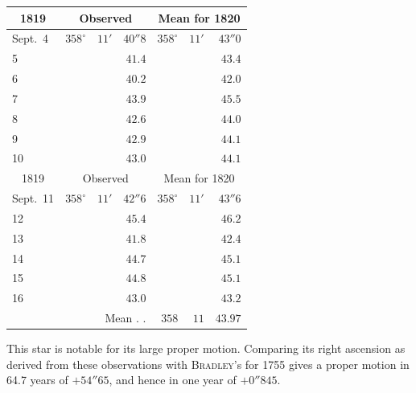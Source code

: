 \begin{center}
\begin{tabular}{l|rrr|rrr}
\multicolumn{1}{c|}{1819}  &  \multicolumn{3}{c|}{Observed}  &  \multicolumn{3}{c}{Mean for 1820}  \\
\hline
Sept.\ 4  &  $358^\circ$  &  $11'$  &  $40''8$  &  $358^\circ$  &  $11'$  &  $43''0$  \\
5  &   &   &  $41.4$  &   &   &  $43.4$  \\
6  &   &   &  $40.2$  &   &   &  $42.0$  \\
7  &   &   &  $43.9$  &   &   &  $45.5$  \\
8  &   &   &  $42.6$  &   &   &  $44.0$  \\
9  &   &   &  $42.9$  &   &   &  $44.1$  \\
10  &   &   &  $43.0$  &   &   &  $44.1$  \\
\hline
 \multicolumn{1}{c|}{1819}  &  \multicolumn{3}{c|}{Observed}  &  \multicolumn{3}{c}{Mean for 1820}  \\
\hline
 Sept.\ 11  &  $358^\circ$  &  $11'$  &  $42''6$  &  $358^\circ$  &  $11'$  &  $43''6$  \\
 12  &   &   &  $45.4$  &   &   &  $46.2$  \\
 13  &   &   &  $41.8$  &   &   &  $42.4$  \\
 14  &   &   &  $44.7$  &   &   &  $45.1$  \\
 15  &   &   &  $44.8$  &   &   &  $45.1$  \\
 16  &   &   &  $43.0$  &   &   &  $43.2$  \\
\multicolumn{4}{r|}{Mean . .} &  $358$  &  $11$  &  $43.97$  \\
\end{tabular}
\end{center}

\par\indent This star is notable for its large proper motion. Comparing its right ascension as derived from these observations with \textsc{Bradley}’s for 1755 gives a proper motion in 64.7 years of $+54''65$, and hence in one year of $+0''845$.
